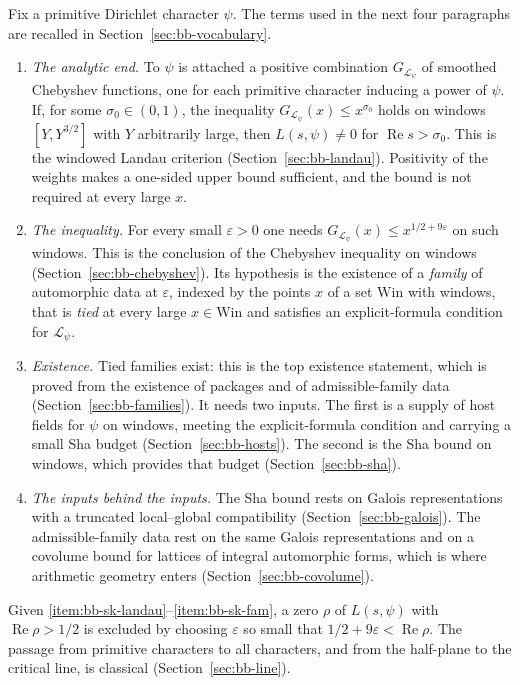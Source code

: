 \documentclass[11pt]{amsbook}
\theoremstyle{plain}
\theoremstyle{definition}
\theoremstyle{remark}
\numberwithin{equation}{section}
\numberwithin{figure}{chapter}
\numberwithin{table}{chapter}
\newcommand{\eps}{\varepsilon}
\newcommand{\lev}{\mathscr{L}}
\newcommand{\Win}{\mathrm{Win}}
\begin{document}
Fix a primitive Dirichlet character $\psi$. The terms used in the
next four paragraphs are recalled in Section~\ref{sec:bb-vocabulary}.
\begin{enumerate}[label=(\Roman*)]
\item\label{item:bb-sk-landau}
\emph{The analytic end.} To $\psi$ is attached a positive
combination $G_{\lev_\psi}$ of smoothed Chebyshev functions, one for
each primitive character inducing a power of $\psi$. If, for some
$\sigma_0\in(0,1)$, the inequality $G_{\lev_\psi}(x)\le x^{\sigma_0}$
holds on windows $[Y,Y^{3/2}]$ with $Y$ arbitrarily large, then
$L(s,\psi)\ne0$ for $\operatorname{Re}s>\sigma_0$. This is the
windowed Landau criterion (Section~\ref{sec:bb-landau}). Positivity
of the weights makes a one-sided upper bound sufficient, and the
bound is not required at every large $x$.
\item\label{item:bb-sk-cheb}
\emph{The inequality.} For every small $\eps>0$ one needs
$G_{\lev_\psi}(x)\le x^{1/2+9\eps}$ on such windows. This is the
conclusion of the Chebyshev inequality on windows
(Section~\ref{sec:bb-chebyshev}). Its hypothesis is the existence of
a \emph{family} of automorphic data at $\eps$, indexed by the points
$x$ of a set $\Win$ with windows, that is \emph{tied} at every large
$x\in\Win$ and satisfies an explicit-formula condition for
$\lev_\psi$.
\item\label{item:bb-sk-fam}
\emph{Existence.} Tied families exist: this is the top existence
statement, which is proved from the existence of packages and of
admissible-family data (Section~\ref{sec:bb-families}). It needs two
inputs. The first is a supply of host fields for $\psi$ on windows,
meeting the explicit-formula condition and carrying a small Sha
budget (Section~\ref{sec:bb-hosts}). The second is the Sha bound on
windows, which provides that budget (Section~\ref{sec:bb-sha}).
\item\label{item:bb-sk-deep}
\emph{The inputs behind the inputs.} The Sha bound rests on Galois
representations with a truncated local--global compatibility
(Section~\ref{sec:bb-galois}). The admissible-family data rest on the
same Galois representations and on a covolume bound for lattices of
integral automorphic forms, which is where arithmetic geometry enters
(Section~\ref{sec:bb-covolume}).
\end{enumerate}
Given \ref{item:bb-sk-landau}--\ref{item:bb-sk-fam}, a zero $\rho$ of
$L(s,\psi)$ with $\operatorname{Re}\rho>1/2$ is excluded by choosing
$\eps$ so small that $1/2+9\eps<\operatorname{Re}\rho$. The passage
from primitive characters to all characters, and from the half-plane
to the critical line, is classical (Section~\ref{sec:bb-line}).
\end{document}
